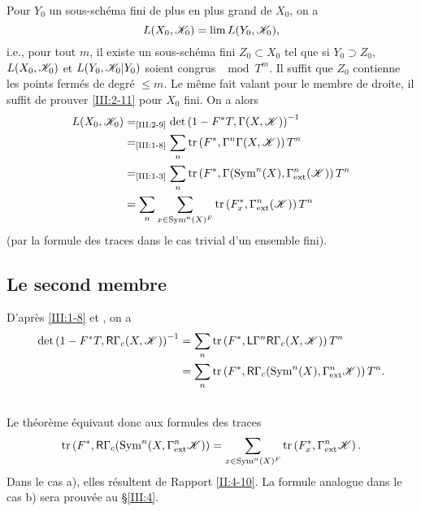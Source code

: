 Pour $Y_0$ un sous-sch\'ema fini de plus en plus grand de $X_0$, on a 
\[
  L(X_0,\mathscr{K}_0) = \lim L(Y_0,\mathscr{K}_0) \text{,}
\]
i.e., pour tout $m$, il existe un sous-sch\'ema fini $Z_0\subset X_0$ tel que 
si $Y_0\supset Z_0$, $L(X_0,\mathscr{K}_0)$ et $L(Y_0,\mathscr{K}_0|Y_0)$ soient congrus 
$\mod T^m$. 
Il suffit que $Z_0$ contienne les points ferm\'es de degr\'e $\leqslant m$. 
Le m\^eme fait valant pour le membre de droite, il suffit de prouver 
\ref{III:2-11} pour $X_0$ fini. On a alors 
\begin{align*}
  L(X_0,\mathscr{K}_0) 
    &=_\text{\ref{III:2-9}} \det\left(1-F^* T,\Gamma(X,\mathscr{K})\right)^{-1} \\
    &=_\text{\ref{III:1-8}} \sum_n \operatorname{tr}\left(F^*,\Gamma^n \Gamma(X,\mathscr{K})\right) T^n \\
    &=_\text{\ref{III:1-3}} \sum_n \operatorname{tr}\left(F^*,\Gamma(\operatorname{Sym}^n(X),\Gamma_\text{ext}^n(\mathscr{K})\right) T^n \\
    &= \sum_n \sum_{x\in \operatorname{Sym}^n(X)^F} \operatorname{tr}\left(F_x^*,\Gamma_\text{ext}^n(\mathscr{K})\right) T^n
\end{align*}
(par la formule des traces dans le cas trivial d'un ensemble fini). 





\subsection{Le second membre}\label{III:2-12}

D'apr\`es \ref{III:1-8} et \cite[XVII 5.5.12]{sga4}, on a 
\begin{align*}
  \det\left(1-F^* T,\mathsf{R}\Gamma_c(X,\mathscr{K})\right)^{-1} 
    &= \sum_n \operatorname{tr}\left(F^*,\mathsf{L}\Gamma^n\mathsf{R}\Gamma_c(X,\mathscr{K})\right) T^n \\
    &= \sum_n \operatorname{tr}\left(F^*,\mathsf{R}\Gamma_c(\operatorname{Sym}^n(X),\Gamma_\text{ext}^n\mathscr{K})\right) T^n \text{.}
\end{align*}





\subsection{}\label{III:2-13}

Le th\'eor\`eme \'equivaut donc aux formules des traces 
\[
  \operatorname{tr}\left(F^*,\mathsf{R}\Gamma_c(\operatorname{Sym}^n(X,\Gamma_\text{ext}^n \mathscr{K})\right) = \sum_{x\in\operatorname{Sym}^n(X)^F} \operatorname{tr}\left(F_x^*,\Gamma_\text{ext}^n\mathscr{K}\right) \text{.}
\]
Dans le cas a), elles r\'esultent de Rapport \ref{II:4-10}. La formule 
analogue dans le cas b) sera prouv\'ee au \S\ref{III:4}. 










